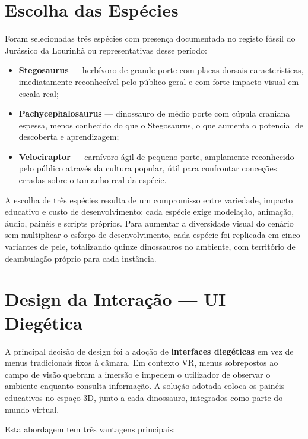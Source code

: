 \documentclass[a4paper,11pt]{report}
\begin{document}
\section{Escolha das Espécies}

Foram selecionadas três espécies com presença documentada no registo fóssil do
Jurássico da Lourinhã ou representativas desse período:

\begin{itemize}
    \setlength\itemsep{0pt}
    \item \textbf{Stegosaurus} --- herbívoro de grande porte com placas dorsais
          características, imediatamente reconhecível pelo público geral e com
          forte impacto visual em escala real;
    \item \textbf{Pachycephalosaurus} --- dinossauro de médio porte com cúpula
          craniana espessa, menos conhecido do que o Stegosaurus, o que aumenta
          o potencial de descoberta e aprendizagem;
    \item \textbf{Velociraptor} --- carnívoro ágil de pequeno porte, amplamente
          reconhecido pelo público através da cultura popular, útil para
          confrontar conceções erradas sobre o tamanho real da espécie.
\end{itemize}

A escolha de três espécies resulta de um compromisso entre variedade, impacto
educativo e custo de desenvolvimento: cada espécie exige modelação, animação,
áudio, painéis e scripts próprios. Para aumentar a diversidade visual do
cenário sem multiplicar o esforço de desenvolvimento, cada espécie foi
replicada em cinco variantes de pele, totalizando quinze dinossauros no
ambiente, com território de deambulação próprio para cada instância.

\section{Design da Interação --- UI Diegética}

A principal decisão de design foi a adoção de \textbf{interfaces diegéticas} em
vez de menus tradicionais fixos à câmara. Em contexto VR, menus sobrepostos ao
campo de visão quebram a imersão e impedem o utilizador de observar o ambiente
enquanto consulta informação. A solução adotada coloca os painéis educativos
no espaço 3D, junto a cada dinossauro, integrados como parte do mundo virtual.

Esta abordagem tem três vantagens principais:
\end{document}

